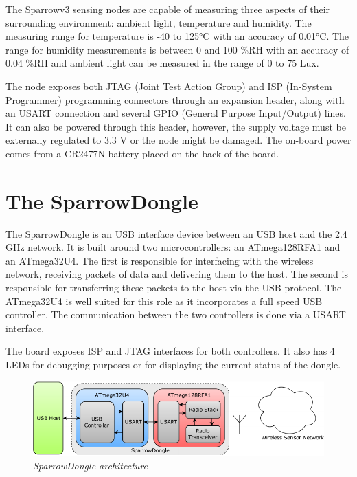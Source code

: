 The Sparrowv3 sensing nodes are capable of measuring three aspects of their
surrounding environment: ambient light, temperature and humidity. The measuring
range for temperature is -40 to 125°C with an accuracy of 0.01°C. The range for
humidity measurements is between 0 and 100 \%RH with an accuracy of 0.04 \%RH
and ambient light can be measured in the range of 0 to 75 Lux.

The node exposes both JTAG (Joint Test Action Group) and ISP (In-System
Programmer) programming connectors through an expansion header, along with an
USART connection and several GPIO (General Purpose Input/Output) lines. It can
also be powered through this header, however, the supply voltage must be
externally regulated to 3.3 V or the node might be damaged.  The on-board power
comes from a CR2477N battery placed on the back of the board.

\section{The SparrowDongle}

The SparrowDongle is an USB interface device between an USB host and the 2.4
GHz network. It is built around two microcontrollers: an \mbox{ATmega128RFA1}
and an \mbox{ATmega32U4}. The first is responsible for interfacing with the
wireless network, receiving packets of data and delivering them to the host.
The second is responsible for transferring these packets to the host via the
USB protocol.  The \mbox{ATmega32U4} is well suited for this role as it
incorporates a full speed USB controller. The communication between the two
controllers is done via a USART interface.

The board exposes ISP and JTAG interfaces for both controllers. It also has 4
LEDs for debugging purposes or for displaying the current status of the dongle.

\begin{figure}[ht]
	\begin{center}
		\includegraphics[width=\textwidth]{img/sparrowdongle.pdf}
	\end{center}
	\caption{\small \itshape{SparrowDongle architecture}}
\end{figure}


